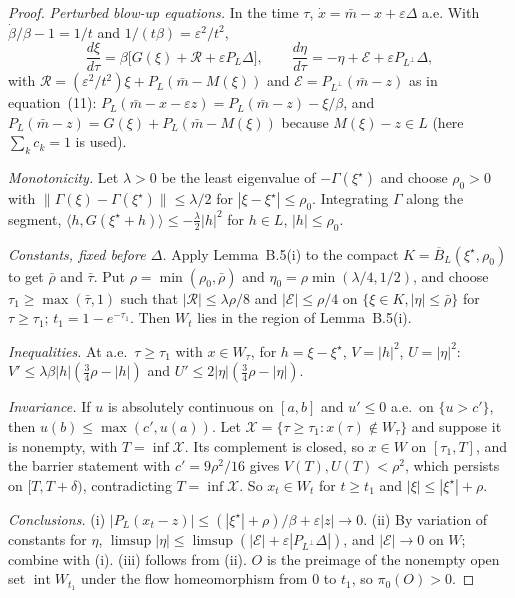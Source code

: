 \documentclass[11pt]{article}
\theoremstyle{definition}
\theoremstyle{remark}
\newcommand{\eps}{\varepsilon}
\begin{document}
\begin{proof}
\emph{Perturbed blow-up equations.} In the time $\tau$, $\dot x=\bar m-x+\eps\Delta$ a.e. With
$\dot\beta/\beta-1=1/t$ and $1/(t\beta)=\eps^2/t^2$,
\[
\frac{d\xi}{d\tau}=\beta\big[G(\xi)+\mathcal R+\eps P_L\Delta\big],\qquad
\frac{d\eta}{d\tau}=-\eta+\mathcal E+\eps P_{L^\perp}\Delta,
\]
with $\mathcal R=(\eps^2/t^2)\xi+P_L(\bar m-M(\xi))$ and $\mathcal E=P_{L^\perp}(\bar m-z)$ as in equation~(11):
$P_L(\bar m-x-\eps z)=P_L(\bar m-z)-\xi/\beta$, and $P_L(\bar m-z)=G(\xi)+P_L(\bar m-M(\xi))$ because
$M(\xi)-z\in L$ (here $\sum_kc_k=1$ is used).

\emph{Monotonicity.} Let $\lambda>0$ be the least eigenvalue of $-\Gamma(\xi^\star)$ and choose $\rho_0>0$
with $\|\Gamma(\xi)-\Gamma(\xi^\star)\|\le\lambda/2$ for $|\xi-\xi^\star|\le\rho_0$. Integrating $\Gamma$ along
the segment, $\langle h,G(\xi^\star+h)\rangle\le-\frac\lambda2|h|^2$ for $h\in L$, $|h|\le\rho_0$.

\emph{Constants, fixed before $\Delta$.} Apply Lemma~B.5(i) to the compact
$K=\overline B_L(\xi^\star,\rho_0)$ to get $\bar\rho$ and $\bar\tau$. Put $\rho=\min(\rho_0,\bar\rho)$ and
$\eta_0=\rho\min(\lambda/4,1/2)$, and choose $\tau_1\ge\max(\bar\tau,1)$ such that
$|\mathcal R|\le\lambda\rho/8$ and $|\mathcal E|\le\rho/4$ on $\{\xi\in K,|\eta|\le\bar\rho\}$ for
$\tau\ge\tau_1$; $t_1=1-e^{-\tau_1}$. Then $W_t$ lies in the region of Lemma~B.5(i).

\emph{Inequalities.} At a.e.\ $\tau\ge\tau_1$ with $x\in W_\tau$, for $h=\xi-\xi^\star$, $V=|h|^2$, $U=|\eta|^2$:
$V'\le\lambda\beta|h|(\frac34\rho-|h|)$ and $U'\le2|\eta|(\frac34\rho-|\eta|)$.

\emph{Invariance.} If $u$ is absolutely continuous on $[a,b]$ and $u'\le0$ a.e.\ on $\{u>c'\}$, then
$u(b)\le\max(c',u(a))$. Let $\mathcal X=\{\tau\ge\tau_1:x(\tau)\notin W_\tau\}$ and suppose it is nonempty,
with $T=\inf\mathcal X$. Its complement is closed, so $x\in W$ on $[\tau_1,T]$, and the barrier statement with
$c'=9\rho^2/16$ gives $V(T),U(T)<\rho^2$, which persists on $[T,T+\delta)$, contradicting $T=\inf\mathcal X$.
So $x_t\in W_t$ for $t\ge t_1$ and $|\xi|\le|\xi^\star|+\rho$.

\emph{Conclusions.} (i) $|P_L(x_t-z)|\le(|\xi^\star|+\rho)/\beta+\eps|z|\to0$. (ii) By variation of
constants for $\eta$, $\limsup|\eta|\le\limsup(|\mathcal E|+\eps|P_{L^\perp}\Delta|)$, and $|\mathcal E|\to0$
on $W$; combine with (i). (iii) follows from (ii). $O$ is the preimage of the nonempty open set
$\operatorname{int}W_{t_1}$ under the flow homeomorphism from $0$ to $t_1$, so $\pi_0(O)>0$.
\end{proof}
\end{document}
